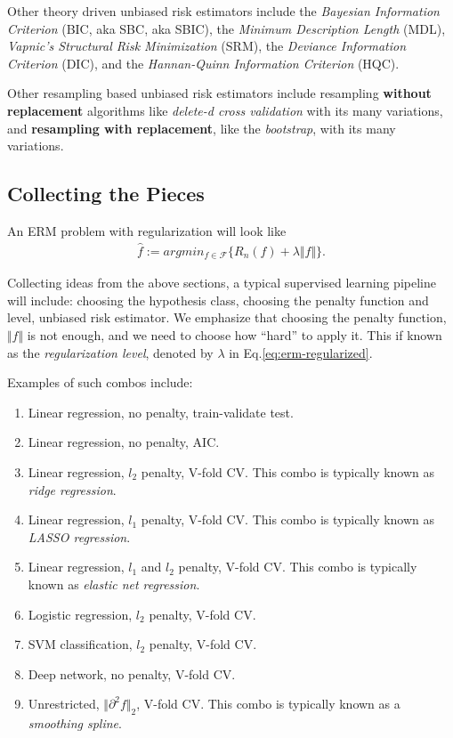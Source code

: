 \documentclass[]{book}
\providecommand{\tightlist}{%
  \setlength{\itemsep}{0pt}\setlength{\parskip}{0pt}}
\theoremstyle{definition}
\theoremstyle{definition}
\theoremstyle{definition}
\theoremstyle{remark}
\begin{document}
Other theory driven unbiased risk estimators include the \emph{Bayesian Information Criterion} (BIC, aka SBC, aka SBIC), the \emph{Minimum Description Length} (MDL), \emph{Vapnic's Structural Risk Minimization} (SRM), the \emph{Deviance Information Criterion} (DIC), and the \emph{Hannan-Quinn Information Criterion} (HQC).

Other resampling based unbiased risk estimators include resampling \textbf{without replacement} algorithms like \emph{delete-d cross validation} with its many variations, and \textbf{resampling with replacement}, like the \emph{bootstrap}, with its many variations.

\hypertarget{collecting-the-pieces}{%
\subsection{Collecting the Pieces}\label{collecting-the-pieces}}

An ERM problem with regularization will look like
\begin{align}
  \hat f := argmin_{f \in \mathcal{F}} \{ R_n(f)  + \lambda \Vert f \Vert \}.
  \label{eq:erm-regularized}  
\end{align}

Collecting ideas from the above sections, a typical supervised learning pipeline will include: choosing the hypothesis class, choosing the penalty function and level, unbiased risk estimator.
We emphasize that choosing the penalty function, \(\Vert f \Vert\) is not enough, and we need to choose how ``hard'' to apply it.
This if known as the \emph{regularization level}, denoted by \(\lambda\) in Eq.\eqref{eq:erm-regularized}.

Examples of such combos include:

\begin{enumerate}
\def\labelenumi{\arabic{enumi}.}
\tightlist
\item
  Linear regression, no penalty, train-validate test.
\item
  Linear regression, no penalty, AIC.
\item
  Linear regression, \(l_2\) penalty, V-fold CV. This combo is typically known as \emph{ridge regression}.
\item
  Linear regression, \(l_1\) penalty, V-fold CV. This combo is typically known as \emph{LASSO regression}.
\item
  Linear regression, \(l_1\) and \(l_2\) penalty, V-fold CV. This combo is typically known as \emph{elastic net regression}.
\item
  Logistic regression, \(l_2\) penalty, V-fold CV.
\item
  SVM classification, \(l_2\) penalty, V-fold CV.
\item
  Deep network, no penalty, V-fold CV.
\item
  Unrestricted, \(\Vert \partial^2 f \Vert_2\), V-fold CV. This combo is typically known as a \emph{smoothing spline}.
\end{enumerate}
\end{document}
